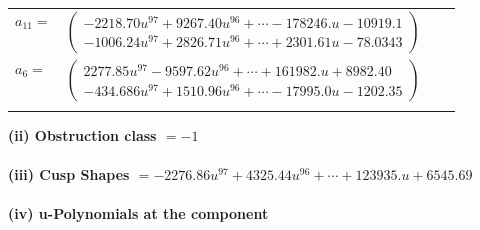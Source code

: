 \documentclass[1p]{elsarticle_modified}
\theoremstyle{definition}
\begin{document}
\begin{tabular}{m{7pt} m{180pt} m{7pt} m{180pt} }
\flushright $a_{11}=$&$\begin{pmatrix}-2218.70 u^{97}+9267.40 u^{96}+\cdots-178246. u-10919.1\\-1006.24 u^{97}+2826.71 u^{96}+\cdots+2301.61 u-78.0343\end{pmatrix}$ \\
\flushright $a_{6}=$&$\begin{pmatrix}2277.85 u^{97}-9597.62 u^{96}+\cdots+161982. u+8982.40\\-434.686 u^{97}+1510.96 u^{96}+\cdots-17995.0 u-1202.35\end{pmatrix}$\\&\end{tabular}
\flushleft \textbf{(ii) Obstruction class $= -1$}\\~\\
\flushleft \textbf{(iii) Cusp Shapes $= -2276.86 u^{97}+4325.44 u^{96}+\cdots+123935. u+6545.69$}\\~\\
\newpage\renewcommand{\arraystretch}{1}
\flushleft \textbf{(iv) u-Polynomials at the component}\newline \\
\end{document}

